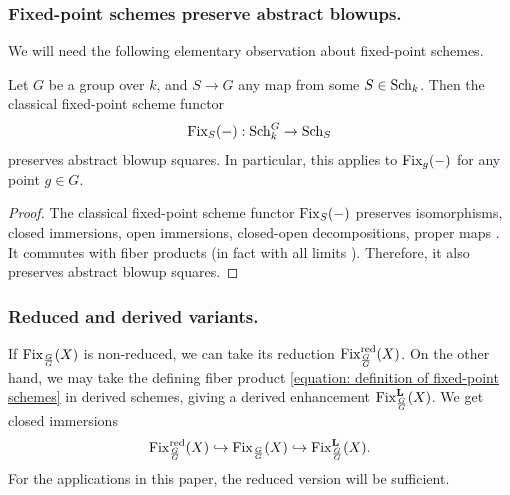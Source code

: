 \subsubsection{Fixed-point schemes preserve abstract blowups.}
We will need the following elementary observation about fixed-point schemes.
\begin{lemma}\label{lemma: fixed-point schemes of abstract blowup squares}
Let $G$ be a group over $k$, and $S \to G$ any map from some $S \in \operatorname{Sch}_k$. Then the classical fixed-point scheme functor
\begin{equation*}
    \operatorname{Fix}_S(-): \operatorname{Sch}_k^G \to \operatorname{Sch}_S
\end{equation*}
preserves abstract blowup squares. In particular, this applies to $\operatorname{Fix}_g(-)$ for any point $g \in G$.
\end{lemma}
\begin{proof}
The classical fixed-point scheme functor $\operatorname{Fix}_S(-)$ preserves isomorphisms, closed immersions, open immersions, closed-open decompositions, proper maps \cite[Propositions 1.2 and 1.3]{Low24}. It commutes with fiber products (in fact with all limits \cite[Lemma 1.7]{Low24}). Therefore, it also preserves abstract blowup squares.
\end{proof}



\subsubsection{Reduced and derived variants.}\label{subsubsection: reduced and derived variants}
If $\operatorname{Fix}_\frac{G}{G}(X)$ is non-reduced, we can take its reduction $\operatorname{Fix}^{\operatorname{red}}_{\frac{G}{G}}(X)$. On the other hand, we may take the defining fiber product \eqref{equation: definition of fixed-point schemes} in derived schemes, giving a derived enhancement $\operatorname{Fix}^{\mathbf{L}}_{\frac{G}{G}}(X)$. We get closed immersions
\begin{equation}\label{equation: reduced, classical and derived fixed-point schemes}
    \operatorname{Fix}^{\operatorname{red}}_{\frac{G}{G}}(X) \hookrightarrow \operatorname{Fix}_{\frac{G}{G}}(X) \hookrightarrow \operatorname{Fix}^{\mathbf{L}}_{\frac{G}{G}}(X).
\end{equation}
For the applications in this paper, the reduced version will be sufficient.


